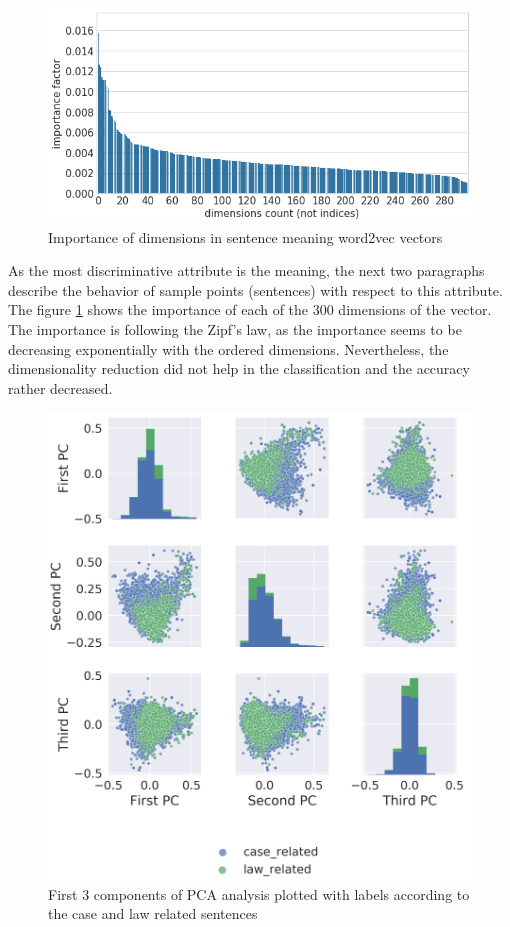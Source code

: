\documentclass[
  digital, %
  notable,   %
  nolof,     %
  nolot,     %
]{fithesis3}
\begin{document}
\begin{figure}[h]
\caption{Importance of dimensions in sentence meaning word2vec vectors}
\label{fig:vec_importance_caselaw}
\includegraphics[width=\textwidth]{img/vec_importance_caselaw}
\end{figure}

As the most discriminative attribute is the meaning, the next two paragraphs describe the behavior of sample points (sentences) with respect to this attribute.
The figure \ref{fig:vec_importance_caselaw} shows the importance of each of the 300 dimensions of the vector.
The importance is following the Zipf's law, as the importance seems to be decreasing exponentially with the ordered dimensions.
Nevertheless, the dimensionality reduction did not help in the classification and the accuracy rather decreased.

\begin{figure}[h]
\caption{First 3 components of PCA analysis plotted with labels according to the case and law related sentences}
\label{fig:PCA_caselaw}
\includegraphics[width=\textwidth]{img/PCA_caselaw}
\end{figure}
\end{document}
